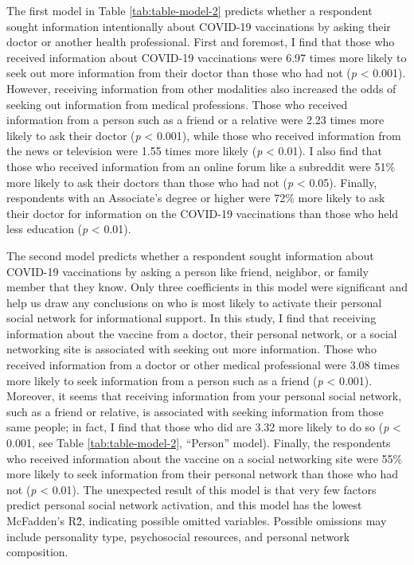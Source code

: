 The first model in Table \ref{tab:table-model-2} predicts whether a respondent
sought information intentionally about COVID-19 vaccinations by asking their
doctor or another health professional. First and foremost, I find that those who
received information about COVID-19 vaccinations were 6.97 times more likely to
seek out more information from their doctor than those who had not (\emph{p}
\textless{} 0.001). However, receiving information from other modalities also
increased the odds of seeking out information from medical professions. Those
who received information from a person such as a friend or a relative were 2.23
times more likely to ask their doctor (\emph{p} \textless{} 0.001), while those
who received information from the news or television were 1.55 times more likely
(\emph{p} \textless{} 0.01). I also find that those who received information
from an online forum like a subreddit were 51\% more likely to ask their doctors
than those who had not (\emph{p} \textless{} 0.05). Finally, respondents with an
Associate's degree or higher were 72\% more likely to ask their doctor for
information on the COVID-19 vaccinations than those who held less education
(\emph{p} \textless{} 0.01).

The second model predicts whether a respondent sought information about COVID-19
vaccinations by asking a person like friend, neighbor, or family member that
they know. Only three coefficients in this model were significant and help us
draw any conclusions on who is most likely to activate their personal social
network for informational support. In this study, I find that receiving
information about the vaccine from a doctor, their personal network, or a social
networking site is associated with seeking out more information. Those who
received information from a doctor or other medical professional were 3.08 times
more likely to seek information from a person such as a friend (\emph{p}
\textless{} 0.001). Moreover, it seems that receiving information from your
personal social network, such as a friend or relative, is associated with
seeking information from those same people; in fact, I find that those who did
are 3.32 more likely to do so (\emph{p} \textless{} 0.001, see Table
\ref{tab:table-model-2}, ``Person'' model). Finally, the
respondents who received information about the vaccine on a social networking
site were 55\% more likely to seek information from their personal network than
those who had not (\emph{p} \textless{} 0.01). The unexpected result of this
model is that very few factors predict personal social network activation, and
this model has the lowest McFadden's R\^{2}, indicating possible omitted
variables. Possible omissions may include personality type, psychosocial
resources, and personal network composition. 

